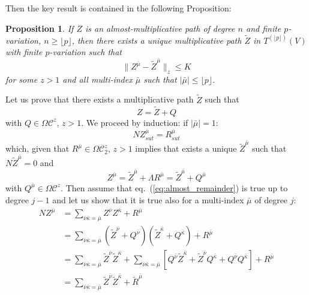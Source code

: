 \documentclass[a4paper,12pt,reqno]{amsproc}
\newcommand{\NN}{N}
\newcommand{\OCC}{\Omega \mathcal{C}}
\newtheorem{proposition}{Proposition}
\begin{document}
Then the key result is contained in the following Proposition:
\begin{proposition}
 If $Z$ is an almost-multiplicative path of degree $n$ and finite
 $p$-variation,  $n \ge \lfloor p \rfloor$, then there exists a unique
 multiplicative path $\widetilde Z$ in $T^{(\lfloor p \rfloor)}(V)$ with finite
 $p$-variation such that
 \begin{equation}
   \label{eq:from_almost_to_multiplicative}
 \|Z^{\bar\mu}-\widetilde Z^{\bar\mu}\|_z \le K  
 \end{equation}
for some $z > 1$ and all multi-index $\bar\mu$ such that $|\bar\mu| \le \lfloor p \rfloor$.
\end{proposition}
\proof
Let us prove that there exists a multiplicative path $\widetilde Z$
such that
\begin{equation}
\label{eq:almost_remainder}
  Z = \widetilde Z + Q
\end{equation}
with $Q \in \OCC^z$, $z > 1$. We proceed by induction: if
$|\bar\mu|=1$:
\begin{equation*}
  \NN Z^{\bar\mu}_{sut} = R^{\bar\mu}_{sut}
\end{equation*}
which, given that $R^{\bar\mu} \in \OCC_2^z$, $z >1$ implies that
exists a unique $\widetilde Z^{\bar\mu}$ such that $\NN \widetilde Z^{\bar\mu}
= 0$ and
\begin{equation*}
  Z^{\bar\mu} =  \widetilde Z^{\bar\mu} + \Lambda R^{\bar\mu} = \widetilde Z^{\bar\mu} + Q^{\bar\mu} 
\end{equation*}
with $Q^{\bar\mu} \in \OCC^z$. Then assume that
eq.~(\ref{eq:almost_remainder}) is true up to degree $j-1$ and let us
show that it is true also for a multi-index $\bar\mu$ of degree $j$:
\begin{equation*}
\begin{split}
\NN Z^{\bar\mu} & = \sum_{\bar\nu \bar\kappa = \bar\mu}
Z^{\bar\nu} Z^{\bar\kappa} + R^{\bar\mu}
\\
& = \sum_{\bar\nu \bar\kappa = \bar\mu}
(\widetilde Z^{\bar\nu}+Q^{\bar\nu})(\widetilde
Z^{\bar\kappa}+Q^{\bar\kappa}) + R^{\bar\mu}
\\ & = \sum_{\bar\nu \bar\kappa = \bar\mu}
\widetilde Z^{\bar\nu} \widetilde
Z^{\bar\kappa} + \sum_{\bar\nu \bar\kappa = \bar\mu} [
Q^{\bar\nu} \widetilde
Z^{\bar\kappa} + \widetilde Z^{\bar\nu} Q^{\bar\kappa}
+ Q^{\bar\nu} Q^{\bar\kappa}]
 + R^{\bar\mu}
\\ 
& = \sum_{\bar\nu \bar\kappa = \bar\mu}
\widetilde Z^{\bar\nu} \widetilde
Z^{\bar\kappa} + \widetilde R^{\bar\mu}
    \end{split}
\end{equation*}
\end{document}
